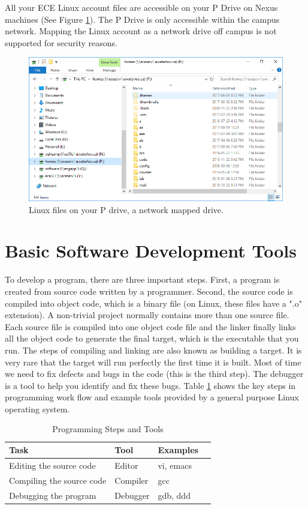 All your ECE Linux account files are accessible on your P Drive on Nexus machines (See Figure \ref{fig_lab0_P_Drive}). The P Drive is only accessible within the campus network. Mapping the Linux account as a network drive off campus is not supported for security reasons.
\begin{figure}[!htb]
  \centering
  \includegraphics[width=6in]{img/lab0/lab0_P_Drive}
  \caption{Linux files on your P drive, a network mapped drive.}
  \label{fig_lab0_P_Drive}
\end{figure}

\section{Basic Software Development Tools}

To develop a program, there are three important steps.
First, a program is created from source code written by a programmer. Second, the source code is compiled into object code, which is a binary file (on Linux, these files have a ".o" extension). A non-trivial project normally contains more than one source file. Each source file is compiled into one object code file and the linker finally links all the object code to generate the final target, which is the executable that you run. The steps of compiling and linking are also known as building a target. It is very rare that the target will run perfectly the first time it is built. Most of time we need to fix defects and bugs in the code (this is the third step). The debugger is a tool to help you identify and fix these bugs. Table \ref{tb_prog_tools} shows the key steps in programming work flow and example tools provided by a general purpose Linux operating system.

\begin{table}[ht]
\begin{center}
\begin{tabular}{llll}
\hline
Task & Tool & Examples\\ \hline
Editing the source code &    Editor & vi, emacs \\  
Compiling the source code &  Compiler & gcc \\ 
Debugging the program	  &  Debugger & gdb, ddd \\ \hline 
\end{tabular}
\caption{Programming Steps and Tools}
\label{tb_prog_tools}
\end{center}
\end{table}

